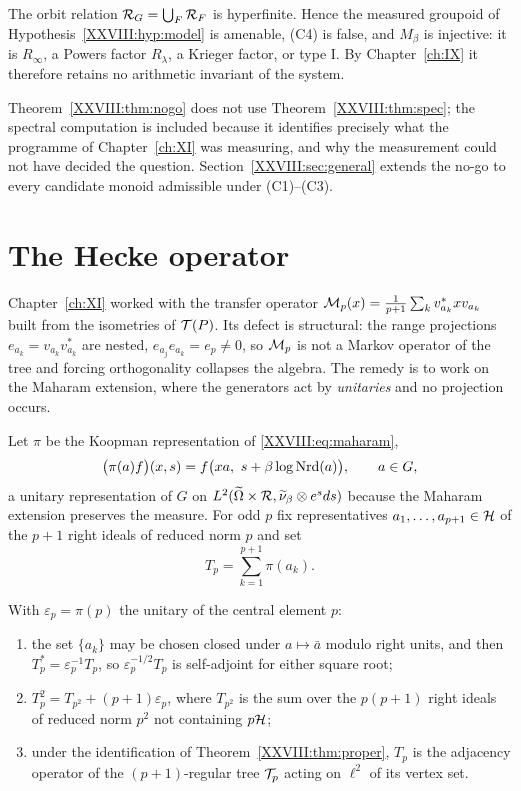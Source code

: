 \begin{theorem}[No-go for (C4)]\label{XXVIII:thm:nogo}
The orbit relation $\mathcal{R}_G=\bigcup_F\mathcal{R}_F$ is hyperfinite. Hence the measured groupoid of
Hypothesis~\ref{XXVIII:hyp:model} is amenable, (C4) is false, and $M_\beta$ is injective: it is
$R_\infty$, a Powers factor $R_\lambda$, a Krieger factor, or type I. By Chapter~\ref{ch:IX} it therefore
retains no arithmetic invariant of the system.
\end{theorem}

Theorem~\ref{XXVIII:thm:nogo} does not use Theorem~\ref{XXVIII:thm:spec}; the spectral computation is included
because it identifies precisely what the programme of Chapter~\ref{ch:XI} was measuring, and why the
measurement could not have decided the question. Section~\ref{XXVIII:sec:general} extends the no-go to
every candidate monoid admissible under (C1)--(C3).

\section{The Hecke operator}\label{XXVIII:sec:hecke}

Chapter~\ref{ch:XI} worked with the transfer operator $\mathcal{M}_p(x)=\frac1{p+1}\sum_kv_{a_k}^*xv_{a_k}$ built
from the isometries of $\mathcal{T}(P)$. Its defect is structural: the range projections
$e_{a_k}=v_{a_k}v_{a_k}^*$ are nested, $e_{a_j}e_{a_k}=e_p\ne0$, so $\mathcal{M}_p$ is not a Markov
operator of the tree and forcing orthogonality collapses the algebra. The remedy is to work on the
Maharam extension, where the generators act by \emph{unitaries} and no projection occurs.

\begin{definition}\label{XXVIII:def:hecke}
Let $\pi$ be the Koopman representation of \eqref{XXVIII:eq:maharam},
\[
\bigl(\pi(a)f\bigr)(x,s)=f\bigl(xa,\ s+\beta\log\Nrd(a)\bigr),
\qquad a\in G,
\]
a unitary representation of $G$ on $L^2(\widetilde\Omega\times\mathcal{R},\widetilde\nu_\beta\otimes e^sds)$
because the Maharam extension preserves the measure. For odd $p$ fix representatives
$a_1,\dots,a_{p+1}\in\mathcal{H}$ of the $p+1$ right ideals of reduced norm $p$ and set
\[
T_p=\sum_{k=1}^{p+1}\pi(a_k).
\]
\end{definition}

\begin{lemma}\label{XXVIII:lem:hecke}
With $\varepsilon_p=\pi(p)$ the unitary of the central element $p$:
\begin{enumerate}
\item the set $\{a_k\}$ may be chosen closed under $a\mapsto\bar a$ modulo right units, and then
$T_p^*=\varepsilon_p^{-1}T_p$, so $\varepsilon_p^{-1/2}T_p$ is self-adjoint for either square root;
\item $T_p^2=T_{p^2}+(p+1)\varepsilon_p$, where $T_{p^2}$ is the sum over the $p(p+1)$ right
ideals of reduced norm $p^2$ not containing $p\mathcal{H}$;
\item under the identification of Theorem~\ref{XXVIII:thm:proper}, $T_p$ is the adjacency operator of the
$(p+1)$-regular tree $\mathcal{T}_p$ acting on $\ell^2$ of its vertex set.
\end{enumerate}
\end{lemma}

